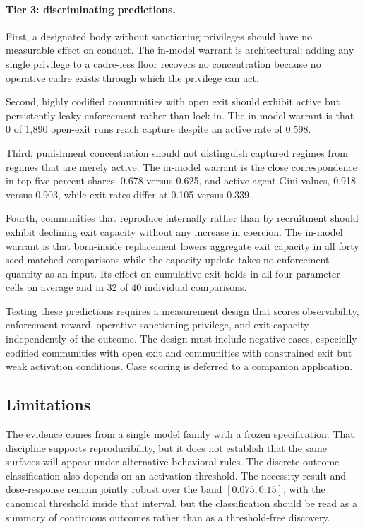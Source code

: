 \documentclass[12pt]{article}
\begin{document}
\paragraph{Tier 3: discriminating predictions.}
First, a designated body without sanctioning privileges should have no measurable effect on conduct. The in-model warrant is architectural: adding any single privilege to a cadre-less floor recovers no concentration because no operative cadre exists through which the privilege can act.

Second, highly codified communities with open exit should exhibit active but persistently leaky enforcement rather than lock-in. The in-model warrant is that 0 of 1,890 open-exit runs reach capture despite an active rate of 0.598.

Third, punishment concentration should not distinguish captured regimes from regimes that are merely active. The in-model warrant is the close correspondence in top-five-percent shares, 0.678 versus 0.625, and active-agent Gini values, 0.918 versus 0.903, while exit rates differ at 0.105 versus 0.339.

Fourth, communities that reproduce internally rather than by recruitment should exhibit declining exit capacity without any increase in coercion. The in-model warrant is that born-inside replacement lowers aggregate exit capacity in all forty seed-matched comparisons while the capacity update takes no enforcement quantity as an input. Its effect on cumulative exit holds in all four parameter cells on average and in 32 of 40 individual comparisons.

Testing these predictions requires a measurement design that scores observability, enforcement reward, operative sanctioning privilege, and exit capacity independently of the outcome. The design must include negative cases, especially codified communities with open exit and communities with constrained exit but weak activation conditions. Case scoring is deferred to a companion application.

\subsection{Limitations}

The evidence comes from a single model family with a frozen specification. That discipline supports reproducibility, but it does not establish that the same surfaces will appear under alternative behavioral rules. The discrete outcome classification also depends on an activation threshold. The necessity result and dose-response remain jointly robust over the band $[0.075,0.15]$, with the canonical threshold inside that interval, but the classification should be read as a summary of continuous outcomes rather than as a threshold-free discovery.
\end{document}
